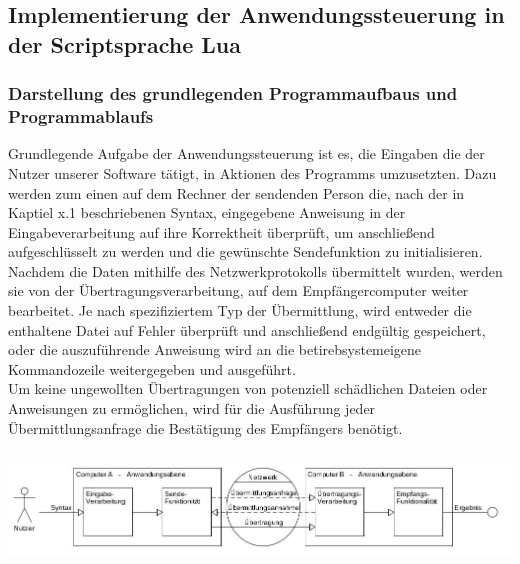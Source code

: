 \documentclass[12pt, a4paper]{scrartcl}
\begin{document}
\newpage
\subsection{Implementierung der Anwendungssteuerung in der Scriptsprache Lua}

\subsubsection{Darstellung des grundlegenden Programmaufbaus und Programmablaufs}
Grundlegende Aufgabe der Anwendungssteuerung ist es, die Eingaben die der Nutzer unserer Software tätigt, in Aktionen des Programms umzusetzten. Dazu werden zum einen auf dem Rechner der sendenden Person die, nach der in Kaptiel x.1 beschriebenen Syntax, eingegebene Anweisung in der Eingabeverarbeitung auf ihre Korrektheit überprüft, um anschließend aufgeschlüsselt zu werden und die gewünschte Sendefunktion zu initialisieren.\\
Nachdem die Daten mithilfe des Netzwerkprotokolls übermittelt wurden, werden sie von der Übertragungsverarbeitung, auf dem Empfängercomputer weiter bearbeitet. Je nach spezifiziertem Typ der Übermittlung, wird entweder die enthaltene Datei auf Fehler überprüft und anschließend endgültig gespeichert, oder die auszuführende Anweisung wird an die betirebsystemeigene Kommandozeile weitergegeben und ausgeführt.\\
Um keine ungewollten Übertragungen von potenziell schädlichen Dateien oder Anweisungen zu ermöglichen, wird für die Ausführung jeder Übermittlungsanfrage die Bestätigung des Empfängers benötigt.\\\hfill\\
\includegraphics[scale=.45]{anw.jpg}
\end{document}
